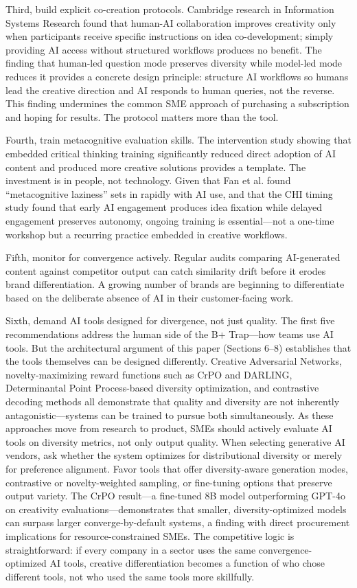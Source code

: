 \documentclass[12pt,a4paper]{article}
\begin{document}
Third, build explicit co-creation protocols. Cambridge research \citep{luan2025} in Information Systems Research found that human-AI collaboration improves creativity only when participants receive specific instructions on idea co-development; simply providing AI access without structured workflows produces no benefit. The \citet{maier2025} finding that human-led question mode preserves diversity while model-led mode reduces it provides a concrete design principle: structure AI workflows so humans lead the creative direction and AI responds to human queries, not the reverse. This finding undermines the common SME approach of purchasing a subscription and hoping for results. The protocol matters more than the tool.

Fourth, train metacognitive evaluation skills. The \citet{hou2026} intervention study showing that embedded critical thinking training significantly reduced direct adoption of AI content and produced more creative solutions provides a template. The investment is in people, not technology. Given that Fan et al. found ``metacognitive laziness'' sets in rapidly with AI use, and that the CHI timing study found that early AI engagement produces idea fixation while delayed engagement preserves autonomy, ongoing training is essential---not a one-time workshop but a recurring practice embedded in creative workflows.

Fifth, monitor for convergence actively. Regular audits comparing AI-generated content against competitor output can catch similarity drift before it erodes brand differentiation. A growing number of brands are beginning to differentiate based on the deliberate absence of AI in their customer-facing work.

Sixth, demand AI tools designed for divergence, not just quality. The first five recommendations address the human side of the B+ Trap---how teams use AI tools. But the architectural argument of this paper (Sections 6--8) establishes that the tools themselves can be designed differently. Creative Adversarial Networks, novelty-maximizing reward functions such as CrPO and DARLING, Determinantal Point Process-based diversity optimization, and contrastive decoding methods all demonstrate that quality and diversity are not inherently antagonistic---systems can be trained to pursue both simultaneously. As these approaches move from research to product, SMEs should actively evaluate AI tools on diversity metrics, not only output quality. When selecting generative AI vendors, ask whether the system optimizes for distributional diversity or merely for preference alignment. Favor tools that offer diversity-aware generation modes, contrastive or novelty-weighted sampling, or fine-tuning options that preserve output variety. The CrPO result---a fine-tuned 8B model outperforming GPT-4o on creativity evaluations---demonstrates that smaller, diversity-optimized models can surpass larger converge-by-default systems, a finding with direct procurement implications for resource-constrained SMEs. The competitive logic is straightforward: if every company in a sector uses the same convergence-optimized AI tools, creative differentiation becomes a function of who chose different tools, not who used the same tools more skillfully.
\end{document}
